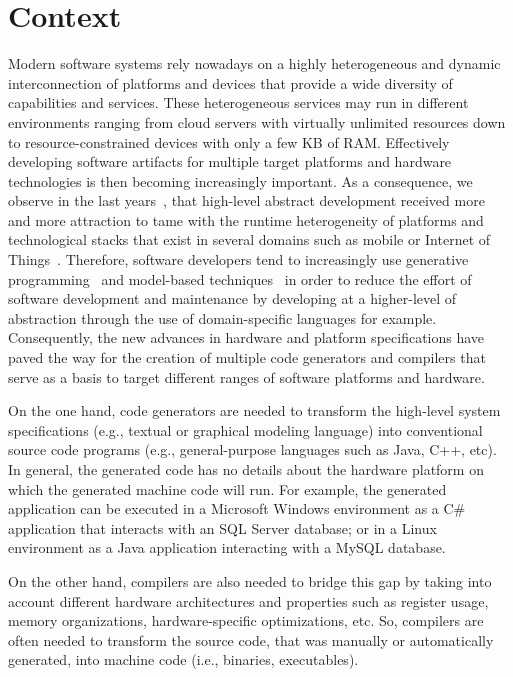 

\section{Context}
Modern software systems rely nowadays on a highly heterogeneous and dynamic interconnection of platforms and devices that provide a wide diversity of capabilities and services. These heterogeneous services may run in different environments ranging from cloud servers with virtually unlimited resources down to resource-constrained devices with only a few KB of RAM. Effectively developing software artifacts for multiple target platforms and hardware technologies is then becoming increasingly important. As a consequence, we observe in the last years~\cite{Czarnecki:2000:GPM:345203}, that high-level abstract development received more and more attraction to tame with the runtime heterogeneity of platforms and technological stacks that exist in several domains such as mobile or Internet of Things~\cite{betz2011improving}.
Therefore, software developers tend to increasingly use generative programming~\cite{Czarnecki:2000:GPM:345203} and model-based techniques~\cite{france2007model} in order to reduce the effort of software development and maintenance by developing at a higher-level of abstraction through the use of domain-specific languages for example. 
Consequently, the new advances in hardware and platform specifications have paved the way for the creation of multiple code generators and compilers that serve as a basis to target different ranges of software platforms and hardware. 

On the one hand, code generators are needed to transform the high-level system specifications (e.g., textual or graphical modeling language) into conventional source code programs (e.g., general-purpose languages such as Java, C++, etc). In general, the generated code has no details about the hardware platform on which the generated machine code will run. For example, the generated application can be executed in a Microsoft Windows environment as a C\# application that interacts with an SQL Server database; or in a Linux environment as a Java application interacting with a MySQL database. 

On the other hand, compilers are also needed to bridge this gap by taking into account different hardware architectures and properties such as register usage, memory organizations, hardware-specific optimizations, etc. So, compilers are often needed to transform the source code, that was manually or automatically generated, into machine code (i.e., binaries, executables). 


